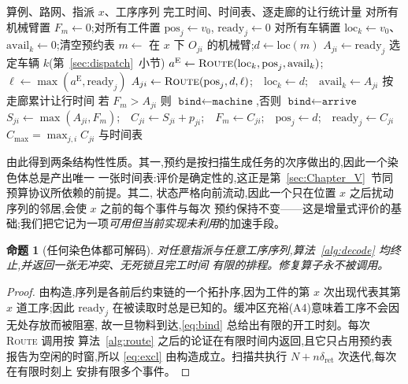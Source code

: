 \documentclass[manuscript,screen,review]{acmart}
\newtheorem{prop}{命题}
\begin{document}
\begin{algorithm}[t]
\caption{\textsc{Decode}:以完整无冲突仿真作为适应度}
\label{alg:decode}
\small
\begin{algorithmic}[1]
\Require 算例、路网、指派 $x$、工序序列
\Ensure 完工时间、时间表、逐走廊的让行统计量
\State 对所有机械臂置 $F_m\gets 0$;对所有工件置 $\mathrm{pos}_j\gets v_0$,
       $\mathrm{ready}_j\gets 0$
\State 对所有车辆置 $\mathrm{loc}_k\gets v_0$、$\mathrm{avail}_k\gets 0$;清空预约表
  \State $m\gets$ 在 $x$ 下 $O_{ji}$ 的机械臂;$d\gets \mathrm{loc}(m)$
     \State $A_{ji}\gets \mathrm{ready}_j$ 
  \Else
     \State 选定车辆 $k$(第~\ref{sec:dispatch}~小节)
     \State $a^{\mathrm{E}}\gets\textsc{Route}(\mathrm{loc}_k,\mathrm{pos}_j,
            \mathrm{avail}_k)$;\ \ $\ell\gets\max(a^{\mathrm{E}},
            \mathrm{ready}_j)$
     \State $A_{ji}\gets\textsc{Route}(\mathrm{pos}_j,d,\ell)$;\ \
            $\mathrm{loc}_k\gets d$;\ \ $\mathrm{avail}_k\gets A_{ji}$
     \State 按走廊累计让行时间
  \EndIf
  \State 若 $F_m>A_{ji}$ 则 $\texttt{bind}\gets\texttt{machine}$,否则
         $\texttt{bind}\gets\texttt{arrive}$
  \State $S_{ji}\gets\max(A_{ji},F_m)$;\ \ $C_{ji}\gets S_{ji}+p_{ji}$;\ \
         $F_m\gets C_{ji}$;\ \ $\mathrm{pos}_j\gets d$;\ \
         $\mathrm{ready}_j\gets C_{ji}$
\EndFor
\State \Return $C_{\max}=\max_{j,i} C_{ji}$ 与时间表
\end{algorithmic}
\end{algorithm}

由此得到两条结构性性质。其一,预约是按扫描生成任务的次序做出的,因此一个染色体总是产出唯一
一张时间表:评价是确定性的,这正是第~\ref{sec:Chapter_V}~节同预算协议所依赖的前提。其二,
状态严格向前流动,因此一个只在位置 $x$ 之后扰动序列的邻居,会使 $x$ 之前的每个事件与每次
预约保持不变——这是增量式评价的基础;我们把它记为一项\emph{可用但当前实现未利用}的加速手段。

\begin{prop}[任何染色体都可解码]
\label{prop:decodable}
对任意指派与任意工序序列,算法~\ref{alg:decode} 均终止,并返回一张无冲突、无死锁且完工时间
有限的排程。修复算子永不被调用。
\end{prop}

\begin{proof}
由构造,序列是各前后约束链的一个拓扑序,因为工件的第 $x$ 次出现代表其第 $x$ 道工序;因此
$\mathrm{ready}_j$ 在被读取时总是已知的。缓冲区充裕(A4)意味着工序不会因无处存放而被阻塞,
故一旦物料到达,\eqref{eq:bind} 总给出有限的开工时刻。每次 \textsc{Route} 调用按
算法~\ref{alg:route} 之后的论证在有限时间内返回,且它只占用预约表报告为空闲的时窗,所以
\eqref{eq:excl} 由构造成立。扫描共执行 $N+n\delta_{\mathrm{ret}}$ 次迭代,每次在有限时刻上
安排有限多个事件。
\end{proof}
\end{document}
